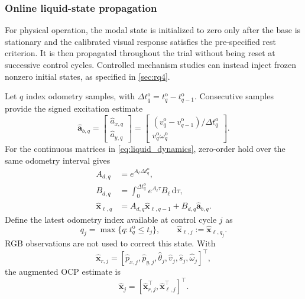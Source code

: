 \subsubsection{Online liquid-state propagation}

For physical operation, the modal state is initialized to zero only after the
base is stationary and the calibrated visual response satisfies the
pre-specified rest criterion. It is then propagated throughout the trial
without being reset at successive control cycles. Controlled mechanism studies
can instead inject frozen nonzero initial states, as specified in
\cref{sec:rq4}.

Let \(q\) index odometry samples, with
\(\Delta t_q^{\mathrm o}=t_q^{\mathrm o}-t_{q-1}^{\mathrm o}\). Consecutive
samples provide the signed excitation estimate
\begin{equation}
  \hat{\bm a}_{b,q}
  =
  \begin{bmatrix}
    \hat a_{x,q}\\
    \hat a_{y,q}
  \end{bmatrix}
  =
  \begin{bmatrix}
    (v_q^{\mathrm o}-v_{q-1}^{\mathrm o})/\Delta t_q^{\mathrm o}\\
    v_q^{\mathrm o}\omega_q^{\mathrm o}
  \end{bmatrix}.
  \label{eq:odom_excitation}
\end{equation}
For the continuous matrices in \cref{eq:liquid_dynamics}, zero-order hold over
the same odometry interval gives
\begin{equation}
\begin{aligned}
  A_{d,q}&=e^{A_\ell\Delta t_q^{\mathrm o}},\\
  B_{d,q}&=\int_0^{\Delta t_q^{\mathrm o}}
  e^{A_\ell\tau}B_\ell\,\mathrm d\tau,\\
  \hat{\bm x}_{\ell,q}
  &=A_{d,q}\hat{\bm x}_{\ell,q-1}
  +B_{d,q}\hat{\bm a}_{b,q}.
\end{aligned}
\label{eq:liquid_state_propagation}
\end{equation}
Define the latest odometry index available at control cycle \(j\) as
\begin{equation}
  q_j=\max\{q:t_q^{\mathrm o}\leq t_j\},
  \qquad
  \hat{\bm x}_{\ell,j}:=\hat{\bm x}_{\ell,q_j}.
  \label{eq:odom_control_alignment}
\end{equation}
RGB observations are not used to correct this state. With
\begin{equation}
  \hat{\bm x}_{r,j}
  =[
  \hat p_{x,j},\hat p_{y,j},\hat\theta_j,
  \hat v_j,\hat s_j,\hat\omega_j
  ]^\top,
  \label{eq:online_robot_state}
\end{equation}
the augmented OCP estimate is
\begin{equation}
  \hat{\bm x}_j
  =
  [\hat{\bm x}_{r,j}^\top,\hat{\bm x}_{\ell,j}^\top]^\top.
  \label{eq:ocp_initial_estimate}
\end{equation}

